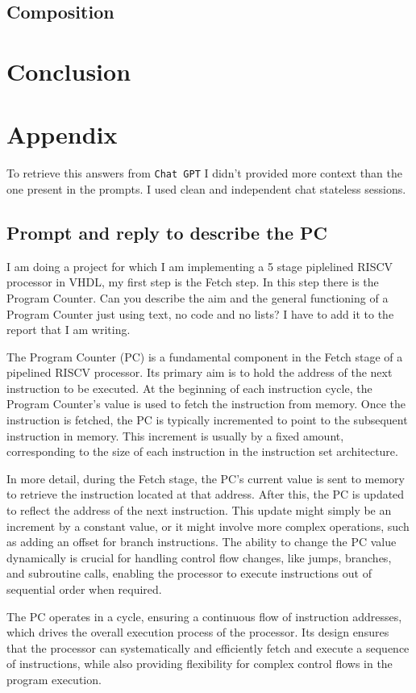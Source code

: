 \documentclass{article}
\begin{document}
\subsection*{Composition}



\section{Conclusion}

\section{Appendix}\label{prompts}
To retrieve this answers from \texttt{Chat GPT} I didn't provided more context than the one present in the prompts. I used clean and independent chat stateless sessions.
\subsection{Prompt and reply to describe the PC}\label{prompt:pc}
\begin{itshape}
    I am doing a project for which I am implementing a 5 stage piplelined RISCV processor in VHDL, my first step is the Fetch step. In this step there is the Program Counter. Can you describe the aim and the general functioning of a Program Counter just using text, no code and no lists? I have to add it to the report that I am writing.
\end{itshape}

\begin{spverbatim}
The Program Counter (PC) is a fundamental component in the Fetch stage of a pipelined RISCV processor. Its primary aim is to hold the address of the next instruction to be executed. At the beginning of each instruction cycle, the Program Counter's value is used to fetch the instruction from memory. Once the instruction is fetched, the PC is typically incremented to point to the subsequent instruction in memory. This increment is usually by a fixed amount, corresponding to the size of each instruction in the instruction set architecture.

In more detail, during the Fetch stage, the PC's current value is sent to memory to retrieve the instruction located at that address. After this, the PC is updated to reflect the address of the next instruction. This update might simply be an increment by a constant value, or it might involve more complex operations, such as adding an offset for branch instructions. The ability to change the PC value dynamically is crucial for handling control flow changes, like jumps, branches, and subroutine calls, enabling the processor to execute instructions out of sequential order when required.

The PC operates in a cycle, ensuring a continuous flow of instruction addresses, which drives the overall execution process of the processor. Its design ensures that the processor can systematically and efficiently fetch and execute a sequence of instructions, while also providing flexibility for complex control flows in the program execution.
\end{spverbatim}
\end{document}
